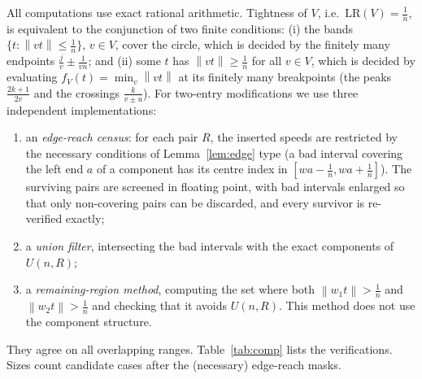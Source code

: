 \documentclass[11pt]{article}
\theoremstyle{definition}
\newcommand{\LR}{\mathrm{LR}}
\newcommand{\norm}[1]{\left\lVert #1 \right\rVert}
\begin{document}
All computations use exact rational arithmetic. Tightness of $V$, i.e.\
$\LR(V)=\frac1n$, is equivalent to the conjunction of two finite
conditions: (i) the bands $\{t:\norm{vt}\le\frac1n\}$, $v\in V$, cover
the circle, which is decided by the finitely many endpoints
$\frac jv\pm\frac1{vn}$; and (ii) some $t$ has $\norm{vt}\ge\frac1n$
for all $v\in V$, which is decided by evaluating
$f_V(t)=\min_v\norm{vt}$ at its finitely many breakpoints (the peaks
$\frac{2k+1}{2v}$ and the crossings $\frac k{v\pm u}$). For two-entry
modifications we use three independent implementations:
\begin{enumerate}
\item an \emph{edge-reach census}: for each pair $R$, the inserted
speeds are restricted by the necessary conditions of
Lemma~\ref{lem:edge} type (a bad interval covering the left end $a$ of
a component has its centre index in $[wa-\frac1n,wa+\frac1n]$). The
surviving pairs are screened in floating point, with bad intervals
enlarged so that only non-covering pairs can be discarded, and every
survivor is re-verified exactly;
\item a \emph{union filter}, intersecting the bad intervals with the
exact components of $U(n,R)$;
\item a \emph{remaining-region method}, computing the set where both
$\norm{w_1t}>\frac1n$ and $\norm{w_2t}>\frac1n$ and checking that it
avoids $U(n,R)$. This method does not use the component structure.
\end{enumerate}
They agree on all overlapping ranges. Table~\ref{tab:comp} lists the
verifications. Sizes count candidate cases after the (necessary)
edge-reach masks.
\end{document}
